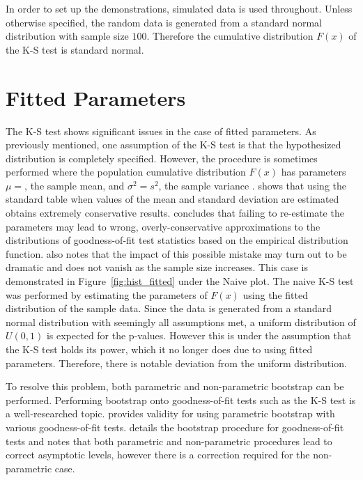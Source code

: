 \documentclass[12pt, letterpaper, titlepage]{article}
\makeatletter
\newcommand*{\Xbar}{}%
\DeclareRobustCommand*{\Xbar}{%
  \mathpalette\@Xbar{}%
}
\newcommand*{\@Xbar}[2]{%
  \sbox0{$#1\mathrm{X}\m@th$}%
  \sbox2{$#1X\m@th$}%
  \rlap{%
    \hbox to\wd2{%
      \hfill
      $\overline{%
        \vrule width 0pt height\ht0 %
        \kern\wd0 %
      }$%
    }%
  }%
  \copy2 %
}
\makeatother
\begin{document}
In order to set up the demonstrations, simulated data is used throughout. Unless otherwise specified, the random data is generated from a standard normal distribution with sample size $100$. Therefore the cumulative distribution $F(x)$ of the K-S test is standard normal.

\hypertarget{sec:fitted}{%
\section{Fitted Parameters}\label{sec:fitted}}

The K-S test shows significant issues in the case of fitted parameters. As previously mentioned, one assumption of the K-S test is that the hypothesized distribution is completely specified. However, the procedure is sometimes performed where the population cumulative distribution $F(x)$ has parameters $\mu=\Xbar$, the sample mean, and $\sigma^2=s^2$, the sample variance \citep{Lilliefors}. \citet{Lilliefors} shows that using the standard table when values of the mean and standard deviation are estimated obtains extremely conservative results. \citet{Capasso} concludes that failing to re-estimate the parameters may lead to wrong, overly-conservative approximations to the distributions of goodness-of-fit test statistics based on the empirical distribution function. \citet{Capasso} also notes that the impact of this possible mistake may turn out to be dramatic and does not vanish as the sample size increases. This case is demonstrated in Figure~\ref{fig:hist_fitted} under the Naive plot. The naive K-S test was performed by estimating the parameters of $F(x)$ using the fitted distribution of the sample data. Since the data is generated from a standard normal distribution with seemingly all assumptions met, a uniform distribution of $U(0,1)$ is expected for the p-values. However this is under the assumption that the K-S test holds its power, which it no longer does due to using fitted parameters. Therefore, there is notable deviation from the uniform distribution. 

To resolve this problem, both parametric and non-parametric bootstrap can be performed. Performing bootstrap onto goodness-of-fit tests such as the K-S test is a well-researched topic. \citet{Genest} provides validity for using parametric bootstrap with various goodness-of-fit tests. \citet{Babu} details the bootstrap procedure for goodness-of-fit tests and notes that both parametric and non-parametric procedures lead to correct asymptotic levels, however there is a correction required for the non-parametric case.
\end{document}
